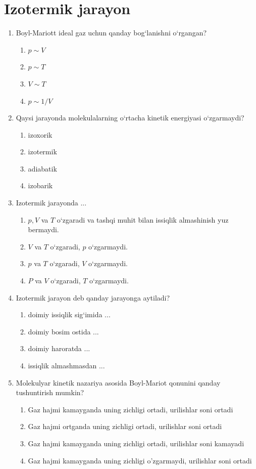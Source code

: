 
\section{Izotermik jarayon}


\begin{enumerate}

\item Boyl-Mariott ideal gaz uchun qanday bog‘lanishni o‘rgangan?
\begin{enumerate}[label=\Alph*)]
\item $p \sim V$
\item $p \sim T$
\item $V \sim T$
\item $p \sim 1/V$
\end{enumerate}

\item Qaysi jarayonda molekulalarning o‘rtacha kinetik energiyasi o‘zgarmaydi?
\begin{enumerate}[label=\Alph*)]
\item izoxorik
\item izotermik
\item adiabatik
\item izobarik

\end{enumerate}

\item Izotermik jarayonda ...
\begin{enumerate}[label=\Alph*)]
\item $p, V$ va $T$ o‘zgaradi va tashqi muhit bilan issiqlik almashinish yuz bermaydi.
\item $V$ va $T$ o‘zgaradi, $p$ o‘zgarmaydi.
\item $p$ va $T$ o‘zgaradi, $V$ o‘zgarmaydi.
\item $P$ va $V$ o‘zgaradi, $T$ o‘zgarmaydi.
\end{enumerate}

\item Izotermik jarayon deb qanday jarayonga aytiladi?
\begin{enumerate}[label=\Alph*)]
\item doimiy issiqlik sig‘imida ...
\item doimiy bosim ostida ...
\item doimiy haroratda ...
\item issiqlik almashmasdan ...
\end{enumerate}

\item Molekulyar kinetik nazariya asosida Boyl-Mariot qonunini qanday tushuntirish mumkin?
\begin{enumerate}[label=\Alph*)]
\item Gaz hajmi kamayganda uning zichligi ortadi, urilishlar soni ortadi
\item Gaz hajmi ortganda uning zichligi ortadi, urilishlar soni ortadi
\item Gaz hajmi kamayganda uning zichligi ortadi, urilishlar soni kamayadi
\item Gaz hajmi kamayganda uning zichligi o'zgarmaydi, urilishlar soni ortadi
\end{enumerate}


\end{enumerate}
